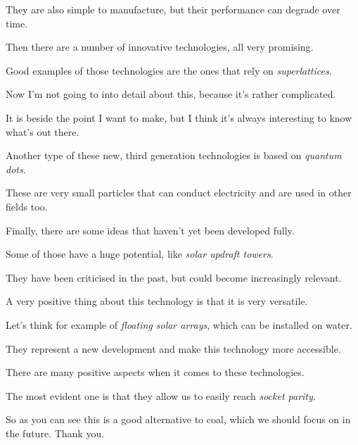 They are also simple to manufacture, but their performance can degrade over time.

\ex Then there are a number of innovative technologies, all very promising.

Good examples of those technologies are the ones that rely on \textit{superlattices}.

Now I'm not going to into detail about this, because it's rather complicated.

\ex It is beside the point I want to make, but I think it's always interesting to know what's out there.

Another type of these new, third generation technologies is based on \textit{quantum dots}.

These are very small particles that can conduct electricity and are used in other fields too.

\ex Finally, there are some ideas that haven't yet been developed fully.

Some of those have a huge potential, like \textit{solar updraft towers}.

They have been criticised in the past, but could become increasingly relevant.

\ex A very positive thing about this technology is that it is very versatile.

Let's think for example of \textit{floating solar arrays}, which can be installed on water.

They represent a new development and make this technology more accessible.

\ex There are many positive aspects when it comes to these technologies.

The most evident one is that they allow us to easily reach \textit{socket parity}.

So as you can see this is a good alternative to coal, which we should focus on in the future.
Thank you.
\z
